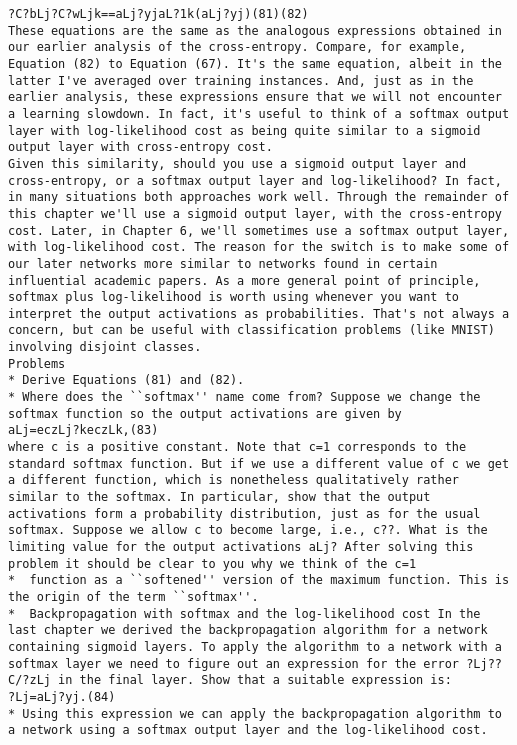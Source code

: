 \begin{lstlisting}
?C?bLj?C?wLjk==aLj?yjaL?1k(aLj?yj)(81)(82)
These equations are the same as the analogous expressions obtained in our earlier analysis of the cross-entropy. Compare, for example, Equation (82) to Equation (67). It's the same equation, albeit in the latter I've averaged over training instances. And, just as in the earlier analysis, these expressions ensure that we will not encounter a learning slowdown. In fact, it's useful to think of a softmax output layer with log-likelihood cost as being quite similar to a sigmoid output layer with cross-entropy cost.
Given this similarity, should you use a sigmoid output layer and cross-entropy, or a softmax output layer and log-likelihood? In fact, in many situations both approaches work well. Through the remainder of this chapter we'll use a sigmoid output layer, with the cross-entropy cost. Later, in Chapter 6, we'll sometimes use a softmax output layer, with log-likelihood cost. The reason for the switch is to make some of our later networks more similar to networks found in certain influential academic papers. As a more general point of principle, softmax plus log-likelihood is worth using whenever you want to interpret the output activations as probabilities. That's not always a concern, but can be useful with classification problems (like MNIST) involving disjoint classes.
Problems
* Derive Equations (81) and (82).
* Where does the ``softmax'' name come from? Suppose we change the softmax function so the output activations are given by 
aLj=eczLj?keczLk,(83)
where c is a positive constant. Note that c=1 corresponds to the standard softmax function. But if we use a different value of c we get a different function, which is nonetheless qualitatively rather similar to the softmax. In particular, show that the output activations form a probability distribution, just as for the usual softmax. Suppose we allow c to become large, i.e., c??. What is the limiting value for the output activations aLj? After solving this problem it should be clear to you why we think of the c=1
*  function as a ``softened'' version of the maximum function. This is the origin of the term ``softmax''.
*  Backpropagation with softmax and the log-likelihood cost In the last chapter we derived the backpropagation algorithm for a network containing sigmoid layers. To apply the algorithm to a network with a softmax layer we need to figure out an expression for the error ?Lj??C/?zLj in the final layer. Show that a suitable expression is: 
?Lj=aLj?yj.(84)
* Using this expression we can apply the backpropagation algorithm to a network using a softmax output layer and the log-likelihood cost.

\end{lstlisting}
